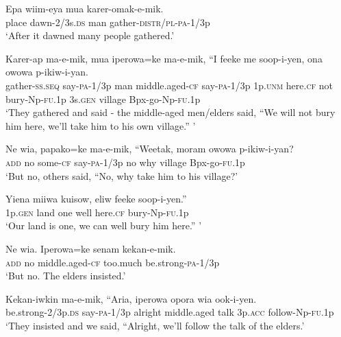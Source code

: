 \ea
\gll  Epa  wiim-eya  mua  karer-omak-e-mik. \\
place  dawn-2/3s.\textsc{ds}  man  gather-\textsc{distr}/\textsc{pl}-\textsc{pa}-1/3p \\
\glt ‘After it dawned many people gathered.’ \\
\z


\ea
\gll  Karer-ap  ma-e-mik,  mua  iperowa=ke  ma-e-mik,  “I             feeke  me  soop-i-yen,  ona  owowa  p-ikiw-i-yan. \\
gather-\textsc{ss.seq}  say-\textsc{pa}-1/3p  man  middle.aged-\textsc{cf}  say-\textsc{pa}-1/3p  1p.\textsc{unm}  here.\textsc{cf}  not  bury-Np-\textsc{fu}.1p  3s.\textsc{gen}  village  Bpx-go-Np-\textsc{fu}.1p \\


\glt ‘They gathered and said - the middle-aged men/elders said, “We will not bury him here, we’ll take him to his own village.” ’ \\
\z


\ea
\gll  Ne  wia,  papako=ke  ma-e-mik,  “Weetak,  moram  owowa  p-ikiw-i-yan? \\
\textsc{add}  no  some-\textsc{cf}  say-\textsc{pa}-1/3p  no  why  village  Bpx-go-\textsc{fu}.1p \\
\glt ‘But no, others said, “No, why take him to his village?’ \\
\z


\ea
\gll  Yiena  miiwa  kuisow,  eliw  feeke  soop-i-yen.” \\
1p.\textsc{gen}  land  one  well  here.\textsc{cf}  bury-Np-\textsc{fu}.1p \\
\glt ‘Our land is one, we can well bury him here.” ’ \\
\z


\ea
\gll  Ne  wia.  Iperowa=ke  senam  kekan-e-mik. \\
\textsc{add}  no  middle.aged-\textsc{cf}  too.much  be.strong-\textsc{pa}-1/3p \\
\glt ‘But no. The elders insisted.’ \\
\z


\ea
\gll  Kekan-iwkin  ma-e-mik,  “Aria,  iperowa  opora  wia            ook-i-yen. \\
be.strong-2/3p.\textsc{ds}  say-\textsc{pa}-1/3p  alright  middle.aged  talk  3p.\textsc{acc}   follow-Np-\textsc{fu}.1p \\


\glt ‘They insisted and we said, “Alright, we’ll follow the talk of the elders.’ \\
\z


